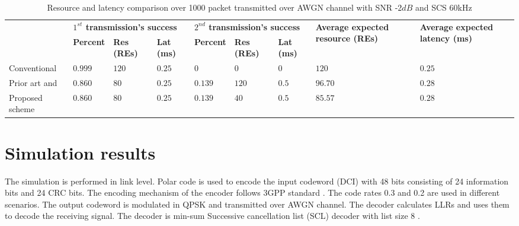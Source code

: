 \documentclass[conference,10pt]{IEEEtran}
\begin{document}
\begin{table}[htbp]
\caption{Resource and latency comparison over 1000 packet transmitted over AWGN channel with SNR -2$dB$ and SCS 60kHz}
\begin{center}
\begin{tabular}{ |p{4.6em}|p{3em}|p{2em}|p{2em}|p{3em}|p{2em}|p{2em}|p{5em}|p{5em}|}
 \hline
 \multirow{2}{6em}{} & \multicolumn{3}{p{6em}}{\textbf{$1^{st}$ transmission's success}}& \multicolumn{3}{|p{6em}|}{\textbf{$2^{nd}$ transmission's success}}& \multirow{2}{6em}{\textbf{Average expected resource (REs)}}& \multirow{2}{6em}{\textbf{Average expected latency (ms)}}\\\cline{2-7}
 &\textbf{Percent} & \textbf{Res (REs)}&\textbf{Lat (ms)}&\textbf{Percent} & \textbf{Res (REs)}&\textbf{Lat (ms)} & &  \\
 \hline
 Conventional&$0.999$&$120$& $0.25$& $0$& $0$ & $0$ &$120$&$0.25$\\
 \hline
 Prior art\cite{b3} and \cite{b4} &$0.860$&$80$& $0.25$& $0.139$& $120$ &  $0.5$&$96.70$&$0.28$\\
  \hline
 Proposed scheme &$0.860$&$80$&$0.25$ & $0.139$& $40$ &  $0.5$&$85.57$&$0.28$\\
 
 

 \hline
\end{tabular}
\label{tab1}
\end{center}
\end{table}
\section{Simulation results}

The simulation is performed in link level. Polar code is used to encode the input codeword (DCI) with 48 bits consisting of 24 information bits and 24 CRC bits. The encoding mechanism of the encoder follows 3GPP standard \cite{b8}. The code rates 0.3 and 0.2 are used in different scenarios. The output codeword is modulated in QPSK and transmitted over AWGN channel. The decoder calculates LLRs and uses them to decode the receiving signal. The decoder is min-sum Successive cancellation list (SCL) decoder with list size 8 \cite{b9}.
\end{document}
